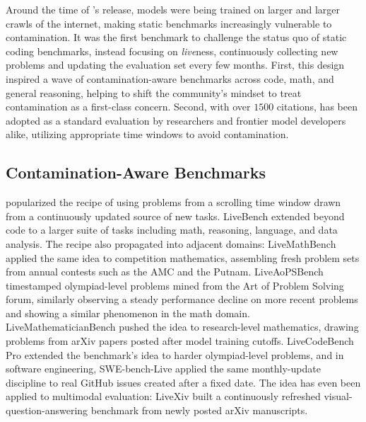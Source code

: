 
Around the time of \livecodebench{}'s release, models were being trained
on larger and larger crawls of the internet, making static benchmarks increasingly vulnerable
to contamination. It was the first benchmark to challenge the status quo of static coding
benchmarks, instead focusing on \emph{live}ness, continuously collecting new problems and
updating the evaluation set every few months. First, this design inspired a wave of
contamination-aware benchmarks across code, math, and general reasoning, helping to shift
the community's mindset to treat contamination as a first-class concern.
Second, with over $1500$ citations, \livecodebench{} has been adopted as a standard evaluation by
researchers and frontier model developers alike, utilizing appropriate time windows
to avoid contamination.

\subsection{Contamination-Aware Benchmarks}
\livecodebench{} popularized the recipe of using problems from a scrolling
time window drawn from a continuously updated source of new tasks. LiveBench
\citep{white2024livebench} extended \livecodebench{} beyond code to a larger suite of tasks
including math, reasoning, language, and data analysis. The recipe also propagated into adjacent domains: LiveMathBench
\citep{liu2024livemathbench} applied the same idea to competition
mathematics, assembling fresh problem sets from annual contests such as the AMC and the
Putnam. LiveAoPSBench \citep{mahdavi2025liveaopsbench} timestamped olympiad-level
problems mined from the Art of Problem Solving forum, similarly observing a steady
performance decline on more recent problems and showing a similar phenomenon in the math domain.
LiveMathematicianBench \citep{he2026livemathematicianbench} pushed the idea to
research-level mathematics, drawing problems from arXiv papers posted after model
training cutoffs.
LiveCodeBench Pro \citep{zheng2025livecodebenchpro} extended the benchmark's idea to harder olympiad-level
problems, and in software engineering, SWE-bench-Live
\citep{zhang2025swebenchlive} applied the same monthly-update discipline to
real GitHub issues created after a fixed date. The idea has even been applied to multimodal
evaluation: LiveXiv \citep{shabtay2024livexiv} built a continuously refreshed
visual-question-answering benchmark from newly posted arXiv manuscripts.

